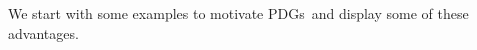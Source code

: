 \documentclass{article}
\newcommand{\MN}{PDG}
\newcommand{\MNs}{\MN s}
\numberwithin{equation}{section}
\begin{document}
%
	We start with some examples to motivate \MNs\ and display some
of these advantages.
	
\end{document}

